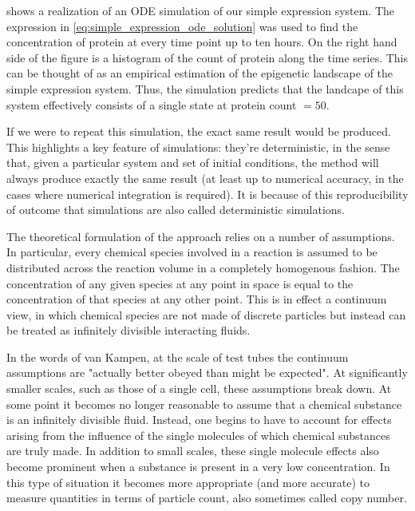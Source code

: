  shows a realization of an ODE simulation of our simple expression system. The expression in \eqref{eq:simple_expression_ode_solution} was used to find the concentration of protein at every time point up to ten hours. On the right hand side of the figure is a histogram of the count of protein along the time series. This can be thought of as an empirical estimation of the epigenetic landscape of the simple expression system. Thus, the  simulation predicts that the landcape of this system effectively consists of a single state at protein count $= 50$.

If we were to repeat this simulation, the exact same result would be produced. This highlights a key feature of  simulations: they're deterministic, in the sense that, given a particular system and set of initial conditions, the method will always produce exactly the same result (at least up to numerical accuracy, in the cases where numerical integration is required). It is because of this reproducibility of outcome that  simulations are also called deterministic simulations.


The theoretical formulation of the  approach relies on a number of assumptions\supercite{Gillespie:2007bx}. In particular, every chemical species involved in a reaction is assumed to be distributed across the reaction volume in a completely homogenous fashion. The concentration of any given species at any point in space is equal to the concentration of that species at any other point. This is in effect a continuum view, in which chemical species are not made of discrete particles but instead can be treated as infinitely divisible interacting fluids.

In the words of van Kampen, at the scale of test tubes the continuum assumptions are "actually better obeyed than might be expected"\supercite{VanKampen:2011vs}. At significantly smaller scales, such as those of a single cell, these assumptions break down. At some point it becomes no longer reasonable to assume that a chemical substance is an infinitely divisible fluid. Instead, one begins to have to account for effects\supercite{Goutsias:2013gz} arising from the influence of the single molecules of which chemical substances are truly made. In addition to small scales, these single molecule effects also become prominent when a substance is present in a very low concentration. In this type of situation it becomes more appropriate (and more accurate) to measure quantities in terms of particle count, also sometimes called copy number.

